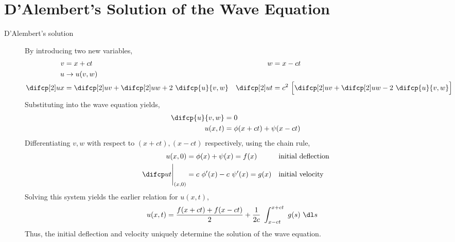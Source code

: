 \section{D'Alembert's Solution of the Wave Equation}

\begin{description}
    \item[D'Alembert's solution] By introducing two new variables,
        \begin{align}
            v                         & = x + ct                                &
            w                         & = x - ct                                  \\
            u                         & \to u(v, w)                               \\
            \difcp[2] ux              & = \difcp[2] uv + \difcp[2] uw
            + 2\ \difcp{u}{v, w}      &
            \difcp[2] ut              & = c^2\ \Big[\difcp[2] uv + \difcp[2] uw
            - 2\ \difcp{u}{v, w}\Big] &
        \end{align}
        Substituting into the wave equation yields,
        \begin{align}
            \difcp{u}{v, w} & = 0                             \\
            u(x, t)         & = \phi (x + ct) + \psi (x - ct)
        \end{align}
        Differentiating $ v, w $  with respect to $ (x + ct), (x - ct) $ respectively,
        using the chain rule,
        \begin{align}
            u(x, 0)                  & = \phi(x) + \psi(x)  = f(x)         &
                                     & \text{initial deflection}             \\
            \difcp ut\Bigg|_{(x, 0)} & = c\ \phi'(x) - c\ \psi'(x)  = g(x) &
                                     & \text{initial velocity}
        \end{align}
        Solving this system yields the earlier relation for $ u(x, t) $,
        \begin{align}
            u(x, t) & = \frac{f(x + ct) + f(x - ct)}{2} + \frac{1}{2c}
            \ \int_{x-ct}^{x + ct}\ g(s)\ \dl s
        \end{align}
        Thus, the initial deflection and velocity uniquely determine the solution of
        the wave equation.


\end{description}
